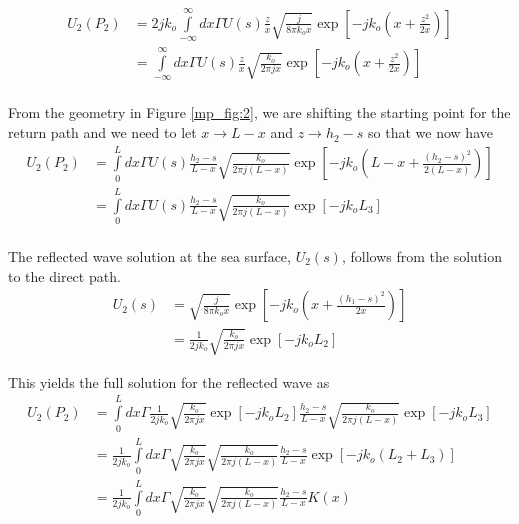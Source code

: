 \begin{equation}
\begin{aligned}
U_2(P_2) &= 2jk_o\int\limits_{-\infty}^{\infty}dx\Gamma U(s)\frac{z}{x}\sqrt{\frac{j}{8\pi k_o x}}\exp\left[-jk_o\left(x +\frac{z^2}{2x} \right) \right] \\
&= \int\limits_{-\infty}^{\infty}dx\Gamma U(s)\frac{z}{x}\sqrt{\frac{k_o}{2\pi j x}}\exp\left[-jk_o\left(x +\frac{z^2}{2x} \right) \right] \\
\end{aligned}
\label{mp_eq:11aaf}
\end{equation}
\renewcommand{\baselinestretch}{2} \small\normalsize

From the geometry in Figure \ref{mp_fig:2}, we are shifting the starting point for the return path and we need to let $x \rightarrow L-x$ and $z \rightarrow h_2-s$ so that we now have
\begin{equation}
\begin{aligned}
U_2(P_2) &= \int\limits_{0}^{L}dx\Gamma U(s)\frac{h_2-s}{L-x}\sqrt{\frac{k_o}{2\pi j (L-x)}}\exp\left[-jk_o\left(L-x +\frac{(h_2-s)^2}{2(L-x)} \right) \right] \\
&= \int\limits_{0}^{L}dx\Gamma U(s)\frac{h_2-s}{L-x}\sqrt{\frac{k_o}{2\pi j (L-x)}}\exp\left[-jk_oL_3\right] \\
\end{aligned}
\label{mp_eq:11aag}
\end{equation}
\renewcommand{\baselinestretch}{2} \small\normalsize

The reflected wave solution at the sea surface, $U_2(s)$, follows from the solution to the direct path.
\begin{equation}
\begin{aligned}
U_2(s) &= \sqrt{\frac{j}{8\pi k_ox}}\exp\left[-jk_o\left(x + \frac{(h_1-s)^2}{2x}\right) \right]\\
&= \frac{1}{2jk_o}\sqrt{\frac{k_o}{2\pi jx}}\exp\left[-jk_oL_2\right]
\end{aligned}
\label{mp_eq:11ae}
\end{equation}
\renewcommand{\baselinestretch}{2} \small\normalsize

\noindent This yields the full solution for the reflected wave as 
\begin{equation}
\begin{aligned}
U_2(P_2) &= \int\limits_{0}^{L}dx\Gamma \frac{1}{2jk_o}\sqrt{\frac{k_o}{2\pi jx}}\exp\left[-jk_oL_2\right]\frac{h_2-s}{L-x}\sqrt{\frac{k_o}{2\pi j (L-x)}}\exp\left[-jk_oL_3 \right]  \\
&= \frac{1}{2jk_o}\int\limits_{0}^{L}dx\Gamma \sqrt{\frac{k_o}{2\pi jx}}\sqrt{\frac{k_o}{2\pi j (L-x)}}\frac{h_2-s}{L-x}\exp\left[-jk_o\left( L_2 + L_3\right) \right]  \\
&= \frac{1}{2jk_o}\int\limits_{0}^{L}dx\Gamma \sqrt{\frac{k_o}{2\pi jx}}\sqrt{\frac{k_o}{2\pi j (L-x)}}\frac{h_2-s}{L-x}K(x) \\
\label{mp_eq:12g}
\end{aligned}
\end{equation}
\renewcommand{\baselinestretch}{2} \small\normalsize

